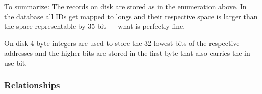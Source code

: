             To summarize: The records on disk are stored as in the enumeration above. 
            In the database all IDs get mapped to longs and their respective space is larger than the space representable by 35 bit --- what is perfectly fine.
               
            On disk 4 byte integers are used to store the 32 lowest bits of the respective addresses and the higher bits are stored in the first byte that also carries the in-use bit.
        
        \subsubsection*{Relationships}
            \begin{figure}[htp]\label{rel_record}
                \begin{center}

\end{center}
\end{figure}
